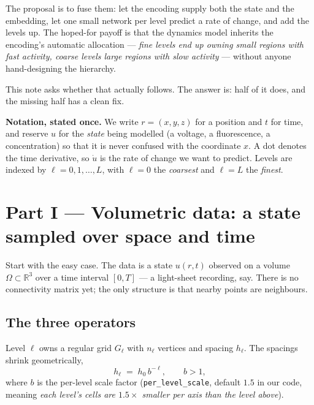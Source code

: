 \documentclass[11pt,a4paper]{article}
\begin{document}
The proposal is to fuse them: let the encoding supply both the state and the embedding, let
one small network per level predict a rate of change, and add the levels up. The hoped-for
payoff is that the dynamics model inherits the encoding's automatic allocation ---
\emph{fine levels end up owning small regions with fast activity, coarse levels large
regions with slow activity} --- without anyone hand-designing the hierarchy.

This note asks whether that actually follows. The answer is: half of it does, and the
missing half has a clean fix.

\medskip
\noindent\textbf{Notation, stated once.} We write $r=(x,y,z)$ for a position and $t$ for
time, and reserve $u$ for the \emph{state} being modelled (a voltage, a fluorescence, a
concentration) so that it is never confused with the coordinate $x$. A dot denotes the time
derivative, so $\dot u$ is the rate of change we want to predict. Levels are indexed by
$\ell = 0,1,\dots,L$, with $\ell=0$ the \emph{coarsest} and $\ell=L$ the \emph{finest}.

\section{Part I --- Volumetric data: a state sampled over space and time}
\label{sec:spatial}

Start with the easy case. The data is a state $u(r,t)$ observed on a volume $\Omega
\subset \mathbb{R}^3$ over a time interval $[0,T]$ --- a light-sheet recording, say. There
is no connectivity matrix yet; the only structure is that nearby points are neighbours.

\subsection{The three operators}

Level $\ell$ owns a regular grid $G_\ell$ with $n_\ell$ vertices and spacing $h_\ell$. The
spacings shrink geometrically,
\begin{equation}
h_\ell \;=\; h_0\, b^{-\ell},
\qquad b>1 ,
\label{eq:ladder}
\end{equation}
where $b$ is the per-level scale factor (\texttt{per\_level\_scale}, default $1.5$ in our
code, meaning \emph{each level's cells are $1.5\times$ smaller per axis than the level
above}).
\end{document}
